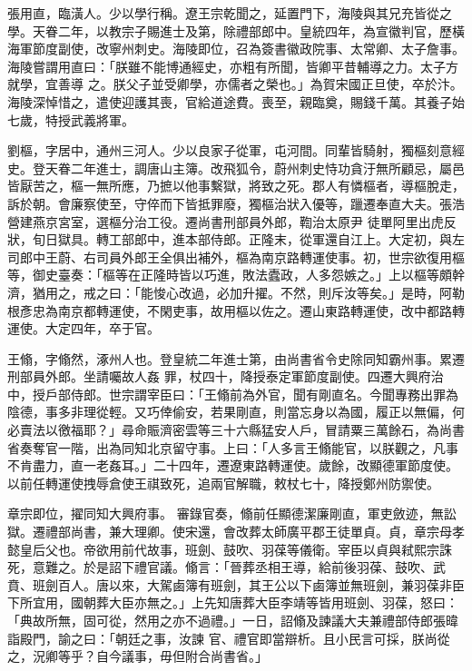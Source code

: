 \begin{pinyinscope}
 張用直，臨潢人。少以學行稱。遼王宗乾聞之，延置門下，海陵與其兄充皆從之學。天眷二年，以教宗子賜進士及第，除禮部郎中。皇統四年，為宣徽判官，歷橫海軍節度副使，改寧州刺史。海陵即位，召為簽書徽政院事、太常卿、太子詹事。海陵嘗謂用直曰：「朕雖不能博通經史，亦粗有所聞，皆卿平昔輔導之力。太子方就學，宜善導
 之。朕父子並受卿學，亦儒者之榮也。」為賀宋國正旦使，卒於汴。海陵深悼惜之，遣使迎護其喪，官給道途費。喪至，親臨奠，賜錢千萬。其養子始七歲，特授武義將軍。



 劉樞，字居中，通州三河人。少以良家子從軍，屯河間。同輩皆騎射，獨樞刻意經史。登天眷二年進士，調唐山主簿。改飛狐令，蔚州刺史恃功貪汙無所顧忌，屬邑皆厭苦之，樞一無所應，乃摭以他事繫獄，將致之死。郡人有憐樞者，導樞脫走，訴於朝。會廉察使至，守倅而下皆抵罪廢，獨樞治狀入優等，躐遷奉直大夫。張浩營建燕京宮室，選樞分治工役。遷尚書刑部員外郎，鞫治太原尹
 徒單阿里出虎反狀，旬日獄具。轉工部郎中，進本部侍郎。正隆末，從軍還自江上。大定初，與左司郎中王蔚、右司員外郎王全俱出補外，樞為南京路轉運使事。初，世宗欲復用樞等，御史臺奏：「樞等在正隆時皆以巧進，敗法蠹政，人多怨嫉之。」上以樞等頗幹濟，猶用之，戒之曰：「能悛心改過，必加升擢。不然，則斥汝等矣。」是時，阿勒根彥忠為南京都轉運使，不閑吏事，故用樞以佐之。遷山東路轉運使，改中都路轉運使。大定四年，卒于官。



 王翛，字翛然，涿州人也。登皇統二年進士第，由尚書省令史除同知霸州事。累遷刑部員外郎。坐請囑故人姦
 罪，杖四十，降授泰定軍節度副使。四遷大興府治中，授戶部侍郎。世宗謂宰臣曰：「王翛前為外官，聞有剛直名。今聞專務出罪為陰德，事多非理從輕。又巧倖偷安，若果剛直，則當忘身以為國，履正以無偏，何必賣法以徼福耶？」尋命賑濟密雲等三十六縣猛安人戶，冒請粟三萬餘石，為尚書省奏奪官一階，出為同知北京留守事。上曰：「人多言王翛能官，以朕觀之，凡事不肯盡力，直一老姦耳。」二十四年，遷遼東路轉運使。歲餘，改顯德軍節度使。以前任轉運使拽辱倉使王祺致死，追兩官解職，敕杖七十，降授鄭州防禦使。



 章宗即位，擢同知大興府事。
 審錄官奏，翛前任顯德潔廉剛直，軍吏斂迹，無訟獄。遷禮部尚書，兼大理卿。使宋還，會改葬太師廣平郡王徒單貞。貞，章宗母孝懿皇后父也。帝欲用前代故事，班劍、鼓吹、羽葆等儀衛。宰臣以貞與弒熙宗誅死，意難之。於是詔下禮官議。翛言：「晉葬丞相王導，給前後羽葆、鼓吹、武賁、班劍百人。唐以來，大駕鹵簿有班劍，其王公以下鹵簿並無班劍，兼羽葆非臣下所宜用，國朝葬大臣亦無之。」上先知唐葬大臣李靖等皆用班劍、羽葆，怒曰：「典故所無，固可從，然用之亦不過禮。」一日，詔翛及諫議大夫兼禮部侍郎張暐詣殿門，諭之曰：「朝廷之事，汝諫
 官、禮官即當辯析。且小民言可採，朕尚從之，況卿等乎？自今議事，毋但附合尚書省。」




\end{pinyinscope}
